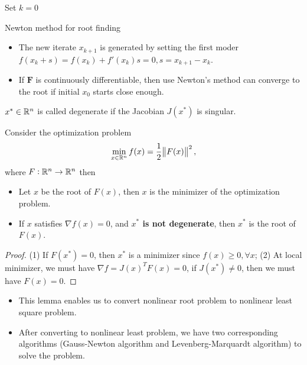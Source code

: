 \begin{refsection}
\begin{algorithm}[H]
	\SetAlgoLined
	Set $k = 0$
	\caption{Newton method for root finding}
\end{algorithm}


\begin{remark}
	\begin{itemize}
		\item The new iterate $x_{k+1}$ is generated by setting the first moder $f(x_{k} + s) = f(x_k) + f'(x_k)s = 0, s = x_{k+1} - x_k$.
		\item If $\bm{F}$ is continuously differentiable, then use Newton's method can converge to the root if initial $x_0$ starts close enough.
	\end{itemize}
\end{remark}

\begin{definition}
$x^*\in \mathbb{R}^n$ is called degenerate if the Jacobian $J(x^*)$ is singular. 
\end{definition}


\begin{lemma}
Consider the optimization problem
$$\min_{x\in \mathbb{R}^n} f(x) = \frac{1}{2} \norm{F(x)}^2,$$
where $F:\mathbb{R}^n\to \mathbb{R}^n$
then
\begin{itemize}
	\item Let $x$ be the root of $F(x)$, then $x$ is the minimizer of the optimization problem.
	\item If $x$ satisfies $\nabla f(x) = 0$, and \textbf{$x^*$ is not degenerate}, then $x^*$ is the root of $F(x)$. 
\end{itemize}
\end{lemma}
\begin{proof}
(1) If $F(x^*) = 0$, then $x^*$ is a minimizer since $f(x)\geq 0,\forall x$; 
(2) At local minimizer, we must have $\nabla f = J(x)^T F(x) = 0$, if $J(x^*) \neq 0$, then we must have $F(x) = 0$.
\end{proof}


\begin{remark}\hfill
	\begin{itemize}
		\item This lemma enables us to convert nonlinear root problem to nonlinear least square problem.
		\item After converting to nonlinear least problem, we have two corresponding algorithms (Gauss-Newton algorithm and Levenberg-Marquardt algorithm) to solve the problem. 
	\end{itemize}
\end{remark}





\end{refsection}
